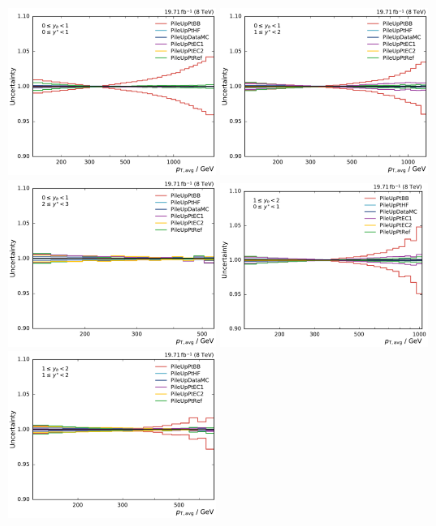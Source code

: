 \begin{figure}[htbp]
    \centering
    \includegraphics[width=0.49\textwidth]{figures/measurement/jec_relunc_5_yb0ys0.pdf}\hfill
    \includegraphics[width=0.49\textwidth]{figures/measurement/jec_relunc_5_yb0ys1.pdf}
    \includegraphics[width=0.49\textwidth]{figures/measurement/jec_relunc_5_yb0ys2.pdf}\hfill
    \includegraphics[width=0.49\textwidth]{figures/measurement/jec_relunc_5_yb1ys0.pdf}
    \includegraphics[width=0.49\textwidth]{figures/measurement/jec_relunc_5_yb1ys1.pdf}\hfill

\end{figure}
